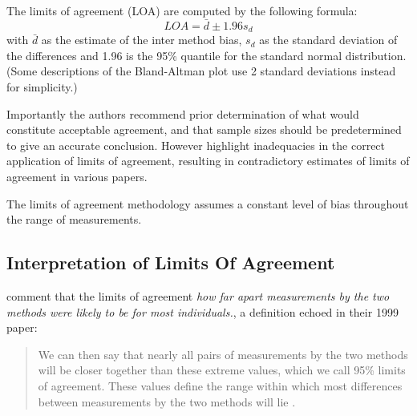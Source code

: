 \documentclass[12pt, a4paper]{report}
\theoremstyle{plain}
\theoremstyle{definition}
\theoremstyle{remark}
\begin{document}
The limits of agreement (LOA) are computed by the following
formula:
\[
LOA = \bar{d} \pm 1.96 s_{d}
\]
with $\bar{d}$ as the estimate of the inter method bias, $s_{d}$
as the standard deviation of the differences and 1.96 is the 95\%
quantile for the standard normal distribution. (Some descriptions of the Bland-Altman plot use 2 standard deviations instead
for simplicity.)

Importantly the authors recommend prior determination of what would constitute acceptable agreement, and that sample sizes should be predetermined to give an accurate conclusion. However \citet{mantha} highlight inadequacies in the correct application of limits of agreement, resulting in contradictory estimates of limits of agreement in various papers.

The limits of agreement methodology assumes a constant level of bias throughout the range of measurements. 






\subsection{Interpretation of Limits Of Agreement}
\citet*{BA95} comment that the limits of agreement \emph{how far
	apart measurements by the two methods were likely to be for most
	individuals.}, a definition echoed in their 1999 paper:
\begin{quote} We can then say that nearly all pairs
	of measurements by the two methods will be closer together than
	these extreme values, which we call 95\% limits of agreement.
	These values define the range within which most differences
	between measurements by the two methods will lie \citep{BA99}.
\end{quote}
%

\end{document}
